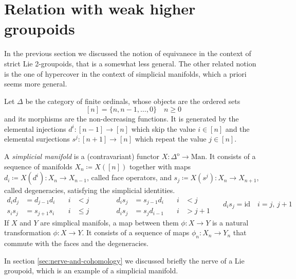 %
%

\section{Relation with weak higher groupoids}

In the previous section we discussed the notion of equivanece in the context of strict Lie 2-groupoids, that is a somewhat less general.
The other related notion is the one of hypercover in the context of simplicial manifolds, which a priori seems more general.

Let $\Delta$ be the category of finite ordinals, whose objects are the ordered sets
$$[n] = {\{n,n-1,\dots,0\}} \quad n\geq 0$$
and its morphisms are the non-decreasing functions.
It is generated by the elemental injections $d^i:[n-1]\to [n]$ which skip the value $i\in[n]$
and the elemental surjections $s^j:[n+1]\to [n]$ which repeat the value $j\in [n]$.

A \emph{simplicial manifold} is a (contravariant) functor $X:\Delta^\text{o}\to \text{Man}$.
It  consists of a sequence of manifolds $X_n\coloneqq X([n])$ together with maps $d_i\coloneqq X(d^i):X_n\to X_{n-1}$, called face operators, and $s_j\coloneqq X(s^j):X_n\to X_{n+1}$, called degeneracies, satisfying the simplicial identities.
\begin{equation}
  \begin{alignedat}{2}
    d_id_j &= d_{j-1}d_i \quad &i &< j \\
    s_is_j &= s_{j+1}s_i \quad &i &\leq j
  \end{alignedat} \qquad\quad
  \begin{alignedat}{2}
    d_is_j &= s_{j-1}d_i \quad &i &< j \\
    d_is_j &= s_jd_{i-1} \quad &i &> j+1
  \end{alignedat} \quad
  \begin{alignedat}{2}
    d_is_j = \text{id} \quad i = j,\, j+1 \\
    & & &
  \end{alignedat}
\end{equation}
If $X$ and $Y$ are simplical manifols, a map between them $\phi:X\to Y$ is a natural transformation $\phi:X\to Y$.
It consists of a sequence of maps $\phi_n:X_n\to Y_n$ that commute with the faces and the degeneracies.

\begin{example}
In section \ref{sec:nerve-and-cohomology} we discussed briefly the nerve of a Lie groupoid, which is an example of a simplicial manifold.
\end{example}

